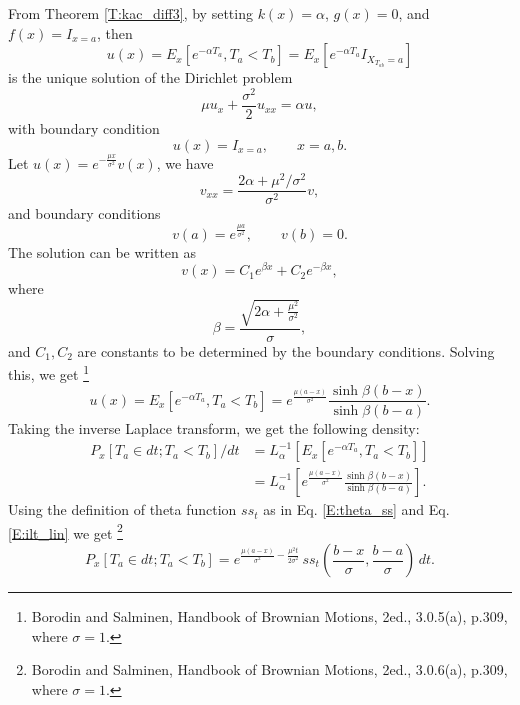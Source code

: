 From Theorem \ref{T:kac_diff3}, by setting $k(x)=\alpha$, $g(x)=0$, and
$f(x)=I_{x=a}$, then 
\[
	u(x) = E_x[e^{-\alpha T_a}, T_a<T_b] 
	= E_x[e^{-\alpha T_a} I_{X_{T_{ab}}=a}]
\]
is the unique solution of the Dirichlet problem
\[
	 \mu u_{x} + \frac{\sigma^2}{2} u_{xx} = \alpha u,
\]
with boundary condition
\[
	u(x)= I_{x=a}, \qquad x=a,b.
\]
Let $u(x) = e^{-\frac{\mu x}{\sigma^2}} v(x)$, we have
\[
	v_{xx}=\frac{2\alpha + \mu^2 / \sigma^2}{\sigma^2} v,
\]
and boundary conditions
\[
	v(a)=e^{\frac{\mu a}{\sigma^2}}, \qquad v(b)=0.
\]
The solution can be written as 
\[
	v(x)=C_1 e^{\beta x} + C_2 e^{-\beta x},
\]
where 
\[
	\beta = \frac{\sqrt{2\alpha+\frac{\mu^2}{\sigma^2}}}{\sigma},
\]
and $C_1,C_2$ are constants to be determined by the boundary conditions.
Solving this, we get
\footnote{Borodin and Salminen, Handbook of Brownian Motions, 2ed., 3.0.5(a),
  p.309, where $\sigma=1$.}
\begin{equation}
	u(x) = E_x[e^{-\alpha T_a}, T_a<T_b] 
	     = e^{\frac{\mu (a-x)}{\sigma^2} } 
	       \frac{\sinh \beta (b-x)}{\sinh \beta(b-a)}.
\end{equation}
Taking the inverse Laplace transform, we get the following density:
\begin{align*}
	P_x[T_a\in dt; T_a<T_b]/dt 
	&= L_{\alpha}^{-1} \left[  E_x[e^{-\alpha T_a}, T_a<T_b] \right] \\
	&= L_{\alpha}^{-1} 
	   \left[ 
		  e^{\frac{\mu (a-x)}{\sigma^2} } \frac{\sinh \beta (b-x)}{\sinh \beta(b-a)}
     \right]. 
\end{align*}
Using the definition of theta function $ss_t$ as in Eq. \ref{E:theta_ss} and Eq.
\ref{E:ilt_lin} we get
\footnote{Borodin and Salminen, Handbook of Brownian Motions, 2ed., 3.0.6(a),
  p.309, where $\sigma=1$.}
\begin{equation}
	P_x[T_a\in dt; T_a<T_b]  
	= e^{\frac{\mu (a-x)}{\sigma^2} - \frac{\mu^2 t}{2\sigma^2}}  \,
	  ss_t \left( \frac{b-x}{\sigma}, \frac{b-a}{\sigma} \right) \, dt.
\end{equation}


